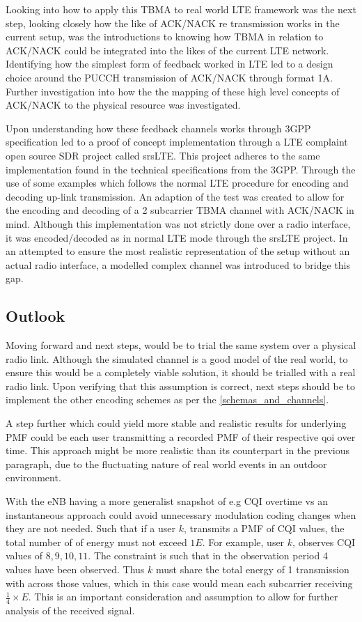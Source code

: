 \documentclass{article}
\begin{document}
Looking into how to apply this TBMA to real world LTE framework was the next step, looking closely how the like of ACK/NACK re transmission works in the current setup, was the introductions to knowing how TBMA in relation to ACK/NACK could be integrated into the likes of the current LTE network. Identifying how the simplest form of feedback worked in LTE led to a design choice around the PUCCH transmission of ACK/NACK through format 1A. Further investigation into how the the  mapping of these high level concepts of ACK/NACK to the physical resource was investigated. 

Upon understanding how these feedback channels works through 3GPP specification led to a proof of concept implementation through a LTE complaint open source SDR project called srsLTE. This project adheres to the same implementation found in the technical specifications from the 3GPP. Through the use of some examples which follows the normal LTE procedure for encoding and decoding up-link transmission. An adaption of the test was created to allow for the encoding and decoding of a 2 subcarrier TBMA channel with ACK/NACK in mind. Although this implementation was not strictly done over a radio interface, it was encoded/decoded as in normal LTE mode through the srsLTE project. In an attempted to ensure the most realistic representation of the setup without an actual radio interface, a modelled complex channel was introduced to bridge this gap. 


\subsection{Outlook}
Moving forward and next steps, would be to trial the same system over a physical radio link. Although the simulated channel is a good model of the real world, to ensure this would be a completely viable solution, it should be trialled with a real radio link. Upon verifying that this assumption is correct, next steps should be to implement the other encoding schemes as per the \cref{schemas_and_channels}. 

A step further which could yield more stable and realistic results for underlying PMF could be each user transmitting a recorded PMF of their respective \ac{qoi} over time. This approach might be more realistic than its counterpart in the previous paragraph, due to the fluctuating nature of real world events in an outdoor environment. 

With the eNB having a more generalist snapshot of e.g CQI overtime vs an instantaneous approach could avoid unnecessary modulation coding changes when they are not needed. Such that if a user $k$, transmits a PMF of CQI values, the total number of of energy must not exceed $1E$. For example, user $k$, observes \ac{CQI} values of $8,9,10,11$. The constraint is such that in the observation period  4 values have been observed. Thus $k$ must share the total energy of 1 transmission with across those values, which in this case would mean each subcarrier receiving $\frac{1}{4} \times E$. This is an important consideration and assumption to allow for further analysis of the received signal. 
\end{document}
